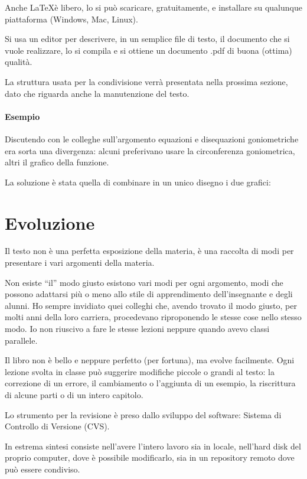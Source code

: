 \documentclass[a4paper,10pt]{article}
\begin{document}
Anche \LaTeX è libero, lo si può scaricare, gratuitamente, e installare 
su qualunque piattaforma (Windows, Mac, Linux).

Si usa un editor per descrivere, in un semplice file di testo, 
il documento che si vuole realizzare, lo si compila e si ottiene un 
documento .pdf di buona (ottima) qualità.

\medskip
La struttura usata per la condivisione verrà presentata nella prossima 
sezione, dato che riguarda anche la manutenzione del testo.

\paragraph{Esempio} Discutendo con le colleghe sull'argomento equazioni e 
disequazioni goniometriche era sorta una divergenza: alcuni preferivano 
usare la circonferenza goniometrica, altri il grafico della funzione.

La soluzione è stata quella di combinare in un unico disegno i due grafici: 

\begin{center}
\disequazionegon
\end{center}


\section{Evoluzione}

Il testo non è una perfetta esposizione della materia, è una raccolta di 
modi per presentare i vari argomenti della materia.

Non esiste ``il'' modo giusto esistono vari modi per ogni argomento, modi 
che possono adattarsi più o meno allo stile di apprendimento 
dell'insegnante e degli alunni. 
Ho sempre invidiato quei colleghi che, avendo trovato il modo giusto, per 
molti anni della loro carriera, procedevano riproponendo le stesse cose nello 
stesso modo. 
Io non riuscivo a fare le stesse lezioni neppure quando avevo classi 
parallele.

Il libro non è bello e neppure perfetto (per fortuna), ma evolve facilmente.
Ogni lezione svolta in classe può suggerire modifiche piccole o grandi al 
testo: la correzione di un errore, il cambiamento o l'aggiunta di un esempio, 
la riscrittura di alcune parti o di un intero capitolo.

Lo strumento per la revisione è preso dallo sviluppo del software: 
Sistema di Controllo di Versione (CVS).

In estrema sintesi consiste nell'avere l'intero lavoro sia in locale, 
nell'hard disk del proprio computer, dove è possibile modificarlo, sia 
in un repository remoto dove può essere condiviso. 
\end{document}
